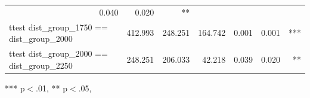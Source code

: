 \documentclass[12pt]{article}
\begin{document}
\begin{table}[!h]
\begin{tabular}{lllllll}
  \multicolumn{1}{r}{0.040} &
  \multicolumn{1}{r}{0.020} &
  \multicolumn{1}{r}{**} \\
\multicolumn{1}{l}{ttest dist\_group\_1750 == dist\_group\_2000} &
  \multicolumn{1}{|r}{412.993} &
  \multicolumn{1}{r}{248.251} &
  \multicolumn{1}{r}{164.742} &
  \multicolumn{1}{r}{0.001} &
  \multicolumn{1}{r}{0.001} &
  \multicolumn{1}{r}{***} \\
\multicolumn{1}{l}{ttest dist\_group\_2000 == dist\_group\_2250} &
  \multicolumn{1}{|r}{248.251} &
  \multicolumn{1}{r}{206.033} &
  \multicolumn{1}{r}{42.218} &
  \multicolumn{1}{r}{0.039} &
  \multicolumn{1}{r}{0.020} &
  \multicolumn{1}{r}{**} \\
\cline{1-7}
\end{tabular}
\break
\footnotesize{
*** p$<$.01, ** p$<$.05,
}
\end{table}
\end{document}
